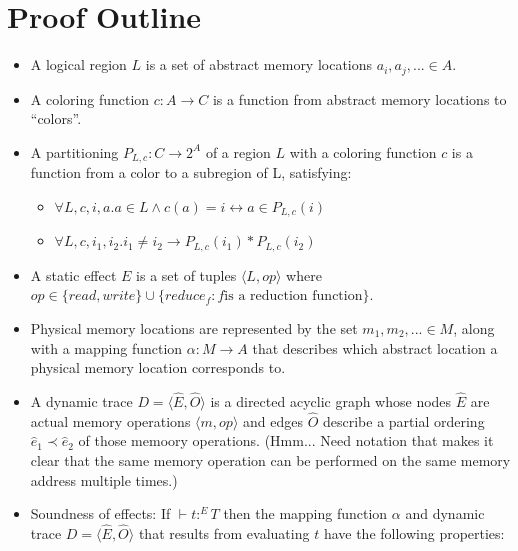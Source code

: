 \section{Proof Outline}

\begin{itemize}

\item A logical region $L$ is a set of abstract memory locations $a_i, a_j, ... \in A$.

\item A coloring function $c : A \rightarrow C$ is a function from abstract memory locations to ``colors''.

\item A partitioning $P_{L,c} : C \rightarrow 2^A$ of a region $L$ with a coloring function $c$ is a function from a color to a subregion of L, satisfying:

\begin{itemize}

\item $\forall L,c,i,a . a \in L \wedge c(a) = i \leftrightarrow a \in P_{L,c}(i)$

\item $\forall L,c,i_1,i_2 . i_1 \neq i_2 \rightarrow P_{L,c}(i_1) * P_{L,c}(i_2)$

\end{itemize}

\item A static effect $E$ is a set of tuples $\langle L, op \rangle$ where $op \in \{ read, write \} \cup \{ reduce_f : f \text{is a reduction function} \}$.

\item Physical memory locations are represented by the set $m_1, m_2, ... \in M$, along with a mapping function $\alpha : M \rightarrow A$ that describes which abstract location a physical memory location corresponds to.

\item A dynamic trace $D = \langle \hat E, \hat O \rangle$ is a directed acyclic graph whose nodes $\hat E$ are actual memory operations $\langle m, op \rangle$ and edges $\hat O$ describe a partial ordering $\hat e_1 \prec \hat e_2$ of those memoory operations.  (Hmm...  Need notation that makes it clear that the same memory operation can be performed on the same memory address multiple times.)

\item Soundness of effects: If $\vdash t : ^ET$ then the mapping function $\alpha$ and dynamic trace $D = \langle \hat E, \hat O \rangle$ that results from evaluating $t$ have the following properties:


\end{itemize}
